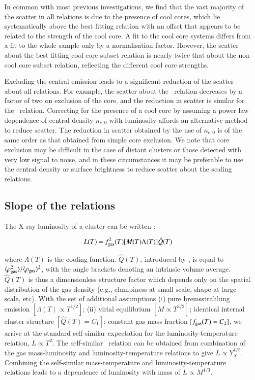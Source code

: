 \documentclass[oldversion]{aa}
\begin{document}
In common with most previous investigations, we find that
the vast majority of the scatter in all relations is due to the presence of
cool cores, which lie systematically above the best fitting relation
with an offset that appears to be related to the strength of the cool
core.  A fit to the cool core systems differs from a fit to the
whole sample only by a normalisation factor. However, the scatter
about the best fitting cool core subset relation is nearly twice that
about the non cool core subset relation, reflecting the different cool
core strengths. 

Excluding the central emission leads to a significant reduction
of the scatter about all relations. For example, the scatter about the
\LxT\ relation decreases by a factor of two on exclusion of the
core, and the reduction in scatter is similar for the \LxYx\
relation. Correcting for the presence of a cool core by assuming a power law dependence of central density $n_{e,0}$ with luminosity affords an alternative method to reduce scatter. The reduction in scatter obtained by the use of $n_{e,0}$ is of the same order as that obtained from simple core exclusion. We note that core exclusion may be difficult in the case of distant clusters or those detected with very low signal to noise, and in these circumstances it may be preferable to use the central density or surface brightness to reduce scatter about the scaling relations. 




\subsection{Slope of the relations}

The X-ray luminosity of a cluster can be written \citep{ae99}:

\begin{equation}
L(T) = f_{\rm gas}^2(T) [M(T) \Lambda(T)] \hat{Q}(T)
\end{equation}

where $\Lambda(T)$ is the cooling function. $\hat{Q}(T)$, introduced by \citet{ae99}, is equal
to $\langle \rho_{\rm gas}^2 \rangle / \langle \rho_{\rm gas}
\rangle^2$, with the angle brackets denoting an intrinsic volume average. $\hat{Q} (T)$ is thus a dimensionless structure factor which depends only on the
spatial distribution of the gas density (e.g., clumpiness at small scale, shape at large scale, etc). With the set of
additional assumptions (i) pure bremsstrahlung 
emission $[\Lambda(T) \propto T^{1/2}]$; (ii) virial equilibrium $[M
\propto T^{3/2}]$; identical internal cluster structure $[\hat{Q}(T) =
C_1]$; constant gas mass fraction $[f_{\rm gas}(T) = C_2]$, we arrive
at the standard self-similar expectation for the
luminosity-temperature relation, $L \propto T^2$. 
The self-similar \LxYx\ relation can be obtained from combination of
the gas mass-luminosity and luminosity-temperature relations to give
$L \propto Y_X^{4/5}$. Combining the self-similar mass-temperature
and luminosity-temperature relations leads 
to a dependence of luminosity with mass of $L \propto M^{4/3}$.
\end{document}

